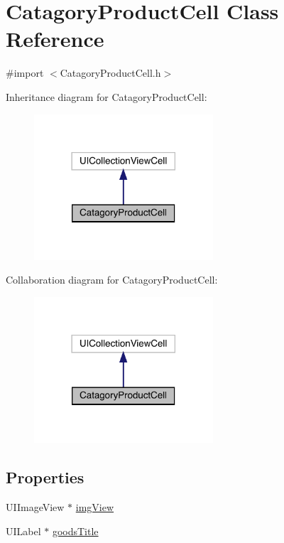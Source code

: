 \hypertarget{interface_catagory_product_cell}{}\section{Catagory\+Product\+Cell Class Reference}
\label{interface_catagory_product_cell}


{\ttfamily \#import $<$Catagory\+Product\+Cell.\+h$>$}



Inheritance diagram for Catagory\+Product\+Cell\+:\nopagebreak
\begin{figure}[H]
\begin{center}
\leavevmode
\includegraphics[width=189pt]{interface_catagory_product_cell__inherit__graph}
\end{center}
\end{figure}


Collaboration diagram for Catagory\+Product\+Cell\+:\nopagebreak
\begin{figure}[H]
\begin{center}
\leavevmode
\includegraphics[width=189pt]{interface_catagory_product_cell__coll__graph}
\end{center}
\end{figure}
\subsection*{Properties}
\begin{DoxyCompactItemize}
\item 
U\+I\+Image\+View $\ast$ \mbox{\hyperlink{interface_catagory_product_cell_ad4d6afd80236ffac04857ae70b69b22c}{img\+View}}
\item 
U\+I\+Label $\ast$ \mbox{\hyperlink{interface_catagory_product_cell_a68489f6e8e204b7e038a4b78103e2704}{goods\+Title}}
\end{DoxyCompactItemize}


